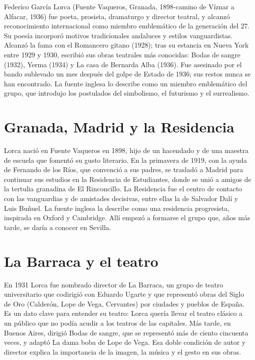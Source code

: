 \documentclass{book}
\begin{document}
Federico García Lorca (Fuente Vaqueros, Granada, 1898-camino de Víznar a Alfacar, 1936) fue poeta, prosista, dramaturgo y director teatral, y alcanzó reconocimiento internacional como miembro emblemático de la generación del 27. Su poesía incorporó motivos tradicionales andaluces y estilos vanguardistas. Alcanzó la fama con el Romancero gitano (1928); tras su estancia en Nueva York entre 1929 y 1930, escribió sus obras teatrales más conocidas: Bodas de sangre (1932), Yerma (1934) y La casa de Bernarda Alba (1936). Fue asesinado por el bando sublevado un mes después del golpe de Estado de 1936; sus restos nunca se han encontrado. La fuente inglesa lo describe como un miembro emblemático del grupo, que introdujo los postulados del simbolismo, el futurismo y el surrealismo.


\section{Granada, Madrid y la Residencia}

Lorca nació en Fuente Vaqueros en 1898, hijo de un hacendado y de una maestra de escuela que fomentó su gusto literario. En la primavera de 1919, con la ayuda de Fernando de los Ríos, que convenció a sus padres, se trasladó a Madrid para continuar sus estudios en la Residencia de Estudiantes, donde se unió a amigos de la tertulia granadina de El Rinconcillo. La Residencia fue el centro de contacto con las vanguardias y de amistades decisivas, entre ellas la de Salvador Dalí y Luis Buñuel. La fuente inglesa la describe como una residencia progresista, inspirada en Oxford y Cambridge. Allí empezó a formarse el grupo que, años más tarde, se daría a conocer en Sevilla.


\section{La Barraca y el teatro}

En 1931 Lorca fue nombrado director de La Barraca, un grupo de teatro universitario que codirigió con Eduardo Ugarte y que representó obras del Siglo de Oro (Calderón, Lope de Vega, Cervantes) por ciudades y pueblos de España. Es un dato clave para entender su teatro: Lorca quería llevar el teatro clásico a un público que no podía acudir a los teatros de las capitales. Más tarde, en Buenos Aires, dirigió Bodas de sangre, que se representó más de ciento cincuenta veces, y adaptó La dama boba de Lope de Vega. Esa doble condición de autor y director explica la importancia de la imagen, la música y el gesto en sus obras.
\end{document}
